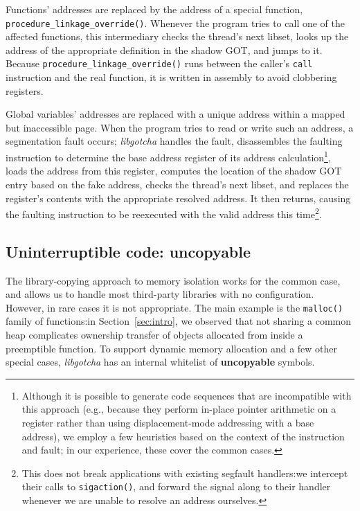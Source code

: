 Functions' addresses are replaced by the address of a special function,
\texttt{procedure\_linkage\_override()}.  Whenever the program tries to call one of
the affected functions, this intermediary checks the thread's next libset, looks up
the address of the appropriate definition in the shadow GOT, and jumps to it.
Because \texttt{procedure\_linkage\_override()} runs between the caller's
\texttt{call} instruction and the real function, it is written in assembly to avoid
clobbering registers.


Global variables' addresses are replaced with a unique address within a mapped but
inaccessible page.  When the program tries to read or write such an address, a
segmentation fault occurs; \textit{libgotcha} handles the fault, disassembles the
faulting instruction to determine the base address register of its address
calculation\footnote{Although it is possible to
generate code sequences that are incompatible with this approach (e.g., because they
perform in-place pointer arithmetic on a register rather than using displacement-mode
addressing with a base address), we employ a few heuristics based on the context of
the instruction and fault; in our experience, these cover the common cases.},
loads the address from this register, computes the location of the
shadow GOT entry based on the fake address, checks the thread's next libset, and
replaces the register's contents with the appropriate resolved address.  It then
returns, causing the faulting instruction to be reexecuted with the valid address
this time\footnote{This does not break applications with existing segfault
handlers:\@ we intercept their calls to \texttt{sigaction()}, and forward the signal
along to their handler whenever we are unable to resolve an address ourselves.}.



\subsection{Uninterruptible code: uncopyable}
\label{sec:uncopyable}

The library-copying approach to memory isolation works for the common case, and
allows us to handle most third-party libraries with no configuration.  However, in
rare cases it is not appropriate.  The main example is the \texttt{malloc()} family
of functions:\@ in Section~\ref{sec:intro}, we observed that not sharing a common
heap complicates ownership transfer of objects allocated from inside a preemptible
function.  To support dynamic memory allocation and a few other special cases,
\textit{libgotcha} has an internal whitelist of \textbf{uncopyable} symbols.

